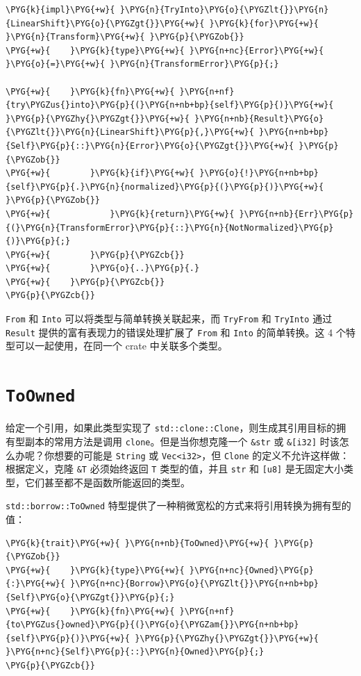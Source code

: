 \begin{Verbatim}[commandchars=\\\{\},breaklines=true,breakanywhere=true,fontsize=\codefont,xleftmargin=17bp]
\PYG{k}{impl}\PYG{+w}{ }\PYG{n}{TryInto}\PYG{o}{\PYGZlt{}}\PYG{n}{LinearShift}\PYG{o}{\PYGZgt{}}\PYG{+w}{ }\PYG{k}{for}\PYG{+w}{ }\PYG{n}{Transform}\PYG{+w}{ }\PYG{p}{\PYGZob{}}
\PYG{+w}{    }\PYG{k}{type}\PYG{+w}{ }\PYG{n+nc}{Error}\PYG{+w}{ }\PYG{o}{=}\PYG{+w}{ }\PYG{n}{TransformError}\PYG{p}{;}

\PYG{+w}{    }\PYG{k}{fn}\PYG{+w}{ }\PYG{n+nf}{try\PYGZus{}into}\PYG{p}{(}\PYG{n+nb+bp}{self}\PYG{p}{)}\PYG{+w}{ }\PYG{p}{\PYGZhy{}\PYGZgt{}}\PYG{+w}{ }\PYG{n+nb}{Result}\PYG{o}{\PYGZlt{}}\PYG{n}{LinearShift}\PYG{p}{,}\PYG{+w}{ }\PYG{n+nb+bp}{Self}\PYG{p}{::}\PYG{n}{Error}\PYG{o}{\PYGZgt{}}\PYG{+w}{ }\PYG{p}{\PYGZob{}}
\PYG{+w}{        }\PYG{k}{if}\PYG{+w}{ }\PYG{o}{!}\PYG{n+nb+bp}{self}\PYG{p}{.}\PYG{n}{normalized}\PYG{p}{(}\PYG{p}{)}\PYG{+w}{ }\PYG{p}{\PYGZob{}}
\PYG{+w}{            }\PYG{k}{return}\PYG{+w}{ }\PYG{n+nb}{Err}\PYG{p}{(}\PYG{n}{TransformError}\PYG{p}{::}\PYG{n}{NotNormalized}\PYG{p}{)}\PYG{p}{;}
\PYG{+w}{        }\PYG{p}{\PYGZcb{}}
\PYG{+w}{        }\PYG{o}{..}\PYG{p}{.}
\PYG{+w}{    }\PYG{p}{\PYGZcb{}}
\PYG{p}{\PYGZcb{}}
\end{Verbatim}

\texttt{From} 和 \texttt{Into} 可以将类型与简单转换关联起来，而 \texttt{TryFrom} 和 \texttt{TryInto} 通过 \texttt{Result} 提供的富有表现力的错误处理扩展了 \texttt{From} 和 \texttt{Into} 的简单转换。这 4 个特型可以一起使用，在同一个 crate 中关联多个类型。

\section{\texttt{ToOwned}}

给定一个引用，如果此类型实现了 \texttt{std::clone::Clone}，则生成其引用目标的拥有型副本的常用方法是调用 \texttt{clone}。但是当你想克隆一个 \texttt{\&str} 或 \texttt{\&[i32]} 时该怎么办呢？你想要的可能是 \texttt{String} 或 \texttt{Vec<i32>}，但 \texttt{Clone} 的定义不允许这样做：根据定义，克隆 \texttt{\&T} 必须始终返回 \texttt{T} 类型的值，并且 \texttt{str} 和 \texttt{[u8]} 是无固定大小类型，它们甚至都不是函数所能返回的类型。

\texttt{std::borrow::ToOwned} 特型提供了一种稍微宽松的方式来将引用转换为拥有型的值：

\begin{Verbatim}[commandchars=\\\{\},breaklines=true,breakanywhere=true,fontsize=\codefont,xleftmargin=17bp]
\PYG{k}{trait}\PYG{+w}{ }\PYG{n+nb}{ToOwned}\PYG{+w}{ }\PYG{p}{\PYGZob{}}
\PYG{+w}{    }\PYG{k}{type}\PYG{+w}{ }\PYG{n+nc}{Owned}\PYG{p}{:}\PYG{+w}{ }\PYG{n+nc}{Borrow}\PYG{o}{\PYGZlt{}}\PYG{n+nb+bp}{Self}\PYG{o}{\PYGZgt{}}\PYG{p}{;}
\PYG{+w}{    }\PYG{k}{fn}\PYG{+w}{ }\PYG{n+nf}{to\PYGZus{}owned}\PYG{p}{(}\PYG{o}{\PYGZam{}}\PYG{n+nb+bp}{self}\PYG{p}{)}\PYG{+w}{ }\PYG{p}{\PYGZhy{}\PYGZgt{}}\PYG{+w}{ }\PYG{n+nc}{Self}\PYG{p}{::}\PYG{n}{Owned}\PYG{p}{;}
\PYG{p}{\PYGZcb{}}
\end{Verbatim}

